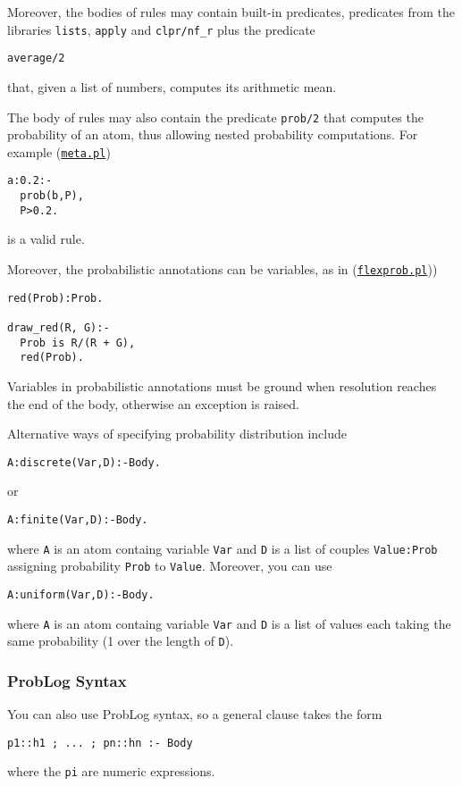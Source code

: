 Moreover, the bodies of rules may contain built-in predicates, predicates
from the libraries \verb|lists|, \verb|apply| and \verb|clpr/nf_r|
plus the predicate
\begin{verbatim}
average/2
\end{verbatim}
that, given a list of numbers, computes its arithmetic mean.

The body of rules may also contain the predicate \verb|prob/2| that computes the
probability of an atom, thus allowing nested probability computations.
For example (\href{http://cplint.lamping.unife.it/example/inference/meta.pl}{\texttt{meta.pl}})
\begin{verbatim}
a:0.2:-
  prob(b,P),
  P>0.2.
\end{verbatim}
is a valid rule.

Moreover, the probabilistic annotations can be variables, as in 
(\href{http://cplint.lamping.unife.it/example/inference/flexprob.pl}{\texttt{flexprob.pl}}))
\begin{verbatim}
red(Prob):Prob.

draw_red(R, G):-
  Prob is R/(R + G),
  red(Prob).
\end{verbatim}
Variables in probabilistic annotations must be ground when resolution reaches the end of the body, 
otherwise an exception is raised.

Alternative ways of specifying probability distribution include
\begin{verbatim}
A:discrete(Var,D):-Body.
\end{verbatim}
or
\begin{verbatim}
A:finite(Var,D):-Body.
\end{verbatim}
where \verb|A| is an atom containg variable \verb|Var| and \verb|D|
is a list of couples \verb|Value:Prob| assigning probability \verb|Prob|
to \verb|Value|. 
Moreover, you can use
\begin{verbatim}
A:uniform(Var,D):-Body.
\end{verbatim}
where \verb|A| is an atom containg variable \verb|Var| and \verb|D|
is a list of values each taking the same probability (1 over the length
of \verb|D|).
\subsubsection{ProbLog Syntax}
You can also use ProbLog \cite{DBLP:conf/ijcai/RaedtKT07} syntax, so a general clause takes the form
\begin{verbatim}
p1::h1 ; ... ; pn::hn :- Body
\end{verbatim}
where the \texttt{pi} are numeric expressions. 

